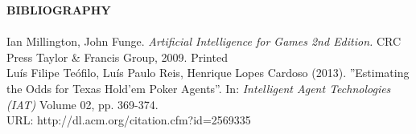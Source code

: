 \documentclass[10pt, a4paper, twocolumn]{article} %
\begin{document}

{\Large {\textbf{BIBLIOGRAPHY}}} \\ \\
Ian Millington, John Funge. \textit{Artificial Intelligence for \indent Games 2nd Edition.} CRC Press Taylor \& Francis \indent Group, 2009. Printed\\

Luís Filipe Teófilo, Luís Paulo Reis, Henrique Lopes \indent Cardoso (2013). ''Estimating the Odds for Texas \indent Hold'em Poker Agents''. In: \textit{Intelligent Agent \indent Technologies (IAT)} Volume 02, pp. 369-374. \\ \indent URL: http://dl.acm.org/citation.cfm?id=2569335

\end{document}

